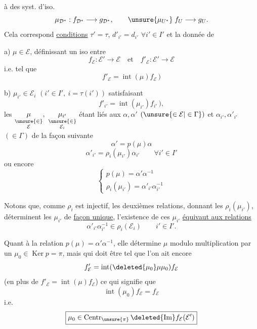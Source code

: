 
 à des syst. d'iso.
\[
\mu_{\mathcal D^*}:f_{\mathcal D^*}\longrightarrow g_{\mathcal D^*},\qquad
\unsure{\mu_{U^*}}\;f_U\longrightarrow g_U.
\]
Cela correspond \uline{conditions} $\tau'=\tau$, $d'_{i'}=d_{i'}$ $\forall i'\in I'$ et la donnée de

a) $\boxed{\boxed{\mu\in\mathcal E}}$, définissant un iso entre
\[
f_{\mathcal E}:\mathcal E'\longrightarrow\mathcal E
\quad\text{et}\quad
f'_{\mathcal E}:\mathcal E'\longrightarrow\mathcal E
\]
i.e.  tel que
\[
\boxed{f'_{\mathcal E}=\operatorname{int}(\mu)f_{\mathcal E}}\,)
\]

b) $\boxed{\boxed{\mu_{i'}\in\mathcal E_i}}$ $(i'\in I',\ i=\tau(i'))$
satisfaisant
\[
\boxed{f'_{i'}=\operatorname{int}(\mu_{i'})f_{i'}}\,),
\]
les $\underset{\substack{\unsure{\in}\\\mathcal E}}{\mu},\ \underset{\substack{\unsure{\in}\\\mathcal E_i}}{\mu_{i'}}$ étant liés aux $\alpha,\alpha'$  $(\unsure{\in\mathcal E|\in\Gamma})$
et $\alpha_{i'},\alpha'_{i'}$ $(\in\Gamma)$ de la façon suivante
\[
\boxed{\alpha'=p(\mu)\alpha}
\]
\[
\boxed{\alpha'_{i'}=\rho_i(\mu_{i'})\alpha_{i'}}\qquad\forall i'\in I'
\]
ou encore
\[
\boxed{\begin{cases}
p(\mu)=\alpha'\alpha^{-1}\\
\rho_i(\mu_{i'})=\alpha'_{i'}\alpha_{i'}^{-1}
\end{cases}}
\]

Notons que, comme $\rho_i$ est injectif, les deuxièmes relations, donnant les $\rho_i(\mu_{i'})$, déterminent les $\mu_{i'}$ de \uline{façon unique}, l'existence de ces $\mu_{i'}$ \uline{équivaut aux relations}
\[
\boxed{\alpha'_{i'}\alpha_{i'}^{-1}\in\rho_i(\mathcal E_i)}\qquad i'\in I'.
\]

Quant à la relation $p(\mu)=\alpha'\alpha^{-1}$, elle détermine $\mu$ modulo multiplication  par un  $\mu_0\in\operatorname{Ker}p=\pi$, mais qui doit être tel que l'on ait encore
\[
f'_{\mathcal E}=\operatorname{int}(\deleted{\mu_0}\mu\mu_0)f_{\mathcal E}
\]
(en plus de $f'_{\mathcal E}=\operatorname{int}(\mu)f_{\mathcal E}$) ce qui signifie  que
\[
\operatorname{int}(\mu_0)f_{\mathcal E}=f_{\mathcal E}
\]
i.e.
\[
\boxed{\mu_0\in\operatorname{Centr}_{\unsure{\pi}}\deleted{\operatorname{Im}}f_{\mathcal E}(\mathcal E')}
\]


